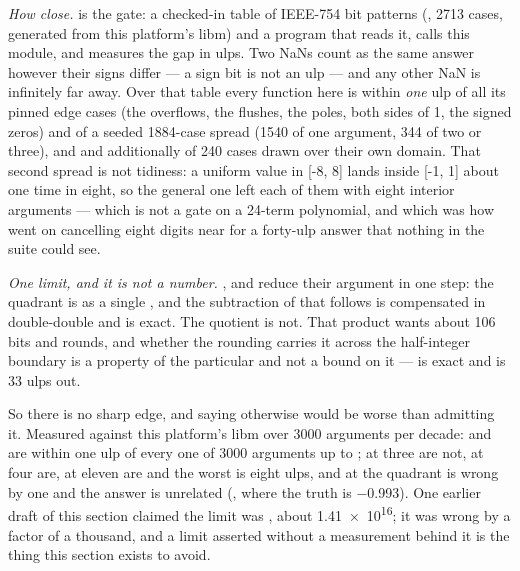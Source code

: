 \emph{How close.}  is the gate: a checked-in table of
IEEE-754 bit patterns (, \num{2713} cases, generated
from this platform's libm) and a program
that reads it, calls this module, and measures the gap in ulps. Two NaNs count as
the same answer however their signs differ --- a sign bit is not an ulp --- and any
other NaN is infinitely far away. Over that table every function here is within
\emph{one} ulp of all its pinned edge cases (the overflows, the flushes, the
poles, both sides of 1, the signed zeros) and of a seeded \num{1884}-case spread (1540 of one argument, 344
of two or three),
and  and  additionally of \num{240} cases drawn over their own
domain. That second spread is not tidiness: a uniform value in [-8, 8] lands
inside [-1, 1] about one time in eight, so the general one left each of them with
eight interior arguments --- which is not a gate on a 24-term polynomial, and
which was how  went on cancelling eight digits near  for a
forty-ulp answer that nothing in the suite could see.

\emph{One limit, and it is not a number.} ,  and 
reduce their argument in one step: the quadrant is  as a
single , and the subtraction of  that follows is
compensated in double-double and is exact. The quotient is not. That product
wants about \num{106} bits and rounds, and whether the rounding carries it
across the half-integer boundary is a property of the particular  and not
a bound on it ---  is exact and  is \num{33} ulps out.

So there is no sharp edge, and saying otherwise would be worse than admitting
it. Measured against this platform's libm over \num{3000} arguments per decade:
 and  are within one ulp of every one of \num{3000} arguments up
to ; at  three are not, at  four are, at 
eleven are and the worst is eight ulps, and at  the quadrant is wrong
by one and the answer is unrelated (, where the truth is
\num{-0.993}). One earlier draft of this section claimed the limit was
, about \num{1.41e16}; it was wrong by a factor of a
thousand, and a limit asserted without a measurement behind it is the thing this
section exists to avoid.

